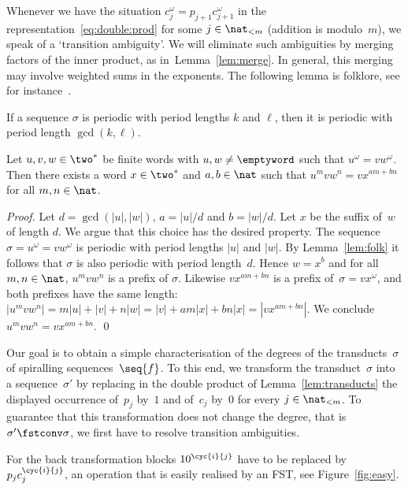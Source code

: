 Whenever we have the situation $c_j^\omega = p_{j+1}c_{j+1}^\omega$ in the representation~\eqref{eq:double:prod}
for some $j \in \nat_{<m}$ (addition is modulo~$m$), we speak of a `transition ambiguity'.
We will eliminate such ambiguities by merging factors of the inner product, 
as in~Lemma~\ref{lem:merge}.
In general, this merging may involve weighted sums in the exponents. 
The following lemma is folklore, see for instance~\cite{caut:mign:shal:wang:yazd:2003}.
\begin{lemma}\label{lem:folk}If a sequence $\sigma$ is periodic with period lengths $k$ and $\ell$,
  then it is periodic with period length $\gcd(k,\ell)$. \end{lemma}


\begin{lemma}\label{lem:merge}
  Let $u,v,w \in \two^*$ be finite words with $u,w \ne \emptyword$ such that $u^\omega = v w^\omega$.
  Then there exists a word $x \in \two^*$ and $a,b \in \nat$ such that
  $u^m vw^n = vx^{am+bn}$ for all $m,n \in \nat$.  
\end{lemma}
\begin{proof}Let $d = \gcd(|u|,|w|)$, $a = |u|/d$ and $b = |w|/d$.
  Let $x$ be the suffix of~$w$ of length $d$.
  We argue that this choice has the desired property. The sequence $\sigma = u^\omega = v w^\omega$ is periodic with period lengths $|u|$ and $|w|$.
  By Lemma~\ref{lem:folk}
it follows that $\sigma$ is also periodic with period length~$d$.
  Hence $w = x^b$ and 
  for all $m,n \in \nat$, $u^m v w^n$ 
  is a prefix of $\sigma$.
  Likewise $v x^{am + bn}$ is a prefix of~$\sigma = v x^\omega$,
  and both prefixes have the same length:
  $|u^m vw^n| = m|u| + |v| + n|w| = |v| + am|x| + bn|x| = |v x^{am + bn}|$.
  We conclude $u^m vw^n = v x^{am + bn}$.
  \qed
\end{proof}

Our goal is to obtain a simple characterisation of the degrees of the transducts~$\sigma$ 
of spiralling sequences~$\seq{f}$.
To this end, we transform the transduct~$\sigma$ into a sequence~$\sigma'$
by replacing in the double product of Lemma~\ref{lem:transducts}
the displayed occurrence of~$p_j$ by~$1$ and of~$c_j$ by~$0$ 
for every $j \in \nat_{<m}$.
To guarantee that this transformation does not change the degree, 
that is $\sigma' \fstconv \sigma$,
we first have to resolve transition ambiguities.

For the back transformation blocks $10^{\cyc{i}{j}}$ 
have to be replaced by $p_j c_j^{\cyc{i}{j}}$,
an operation that is easily realised by an FST,
see Figure~\ref{fig:easy}.

